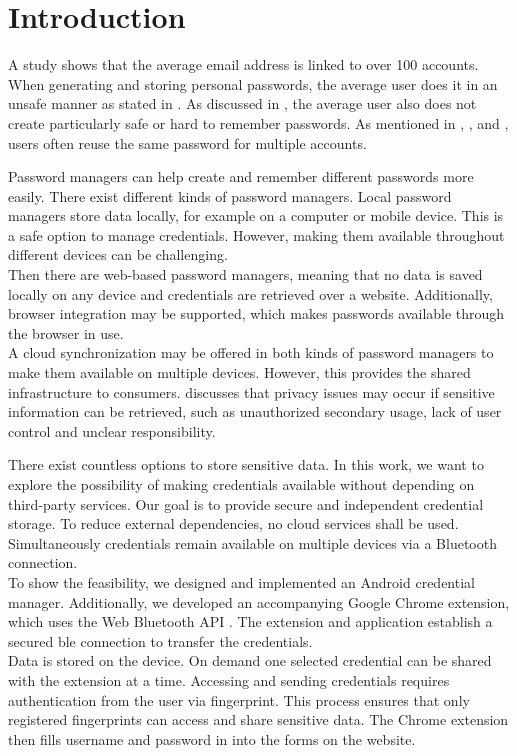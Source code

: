 \section{Introduction} \label{introduction}
A study \cite{DigitalGuardian} shows that the average email address is linked to over 100 accounts.
When generating and storing personal passwords, the average user does it in an unsafe manner as stated in \cite{pilar2012passwords}. As discussed in \cite{AdamsS99}, the average user also does not create particularly safe or hard to remember passwords. As mentioned in \cite{AdamsS99}, \cite{pilar2012passwords}, and \cite{Statista}, users often reuse the same password for multiple accounts.

Password managers can help create and remember different passwords more easily. There exist different kinds of password managers. Local password managers store data locally, for example on a computer or mobile device. This is a safe option to manage credentials. However, making them available throughout different devices can be challenging. \\
Then there are web-based password managers, meaning that no data is saved locally on any device and credentials are retrieved over a website. Additionally, browser integration may be supported, which makes passwords available through the browser in use. \\
A cloud synchronization may be offered in both kinds of password managers to make them available on multiple devices. However, this provides the shared infrastructure to consumers. \cite{SainiM14} discusses that privacy issues may occur if sensitive information can be retrieved, such as unauthorized secondary usage, lack of user control and unclear responsibility.

There exist countless options to store sensitive data. In this work, we want to explore the possibility of making credentials available without depending on third-party services. Our goal is to provide secure and independent credential storage. To reduce external dependencies, no cloud services shall be used. Simultaneously credentials remain available on multiple devices via a Bluetooth connection. \\
To show the feasibility, we designed and implemented an Android credential manager.  Additionally, we developed an accompanying Google Chrome extension, which uses the Web Bluetooth API \cite{WebBTAPI}. The extension and application establish a secured \gls{ble} connection to transfer the credentials. \\
Data is stored on the device. On demand one selected credential can be shared with the extension at a time. Accessing and sending credentials requires authentication from the user via fingerprint. This process ensures that only registered fingerprints can access and share sensitive data. 
The Chrome extension then fills username and password in into the forms on the website. \\

